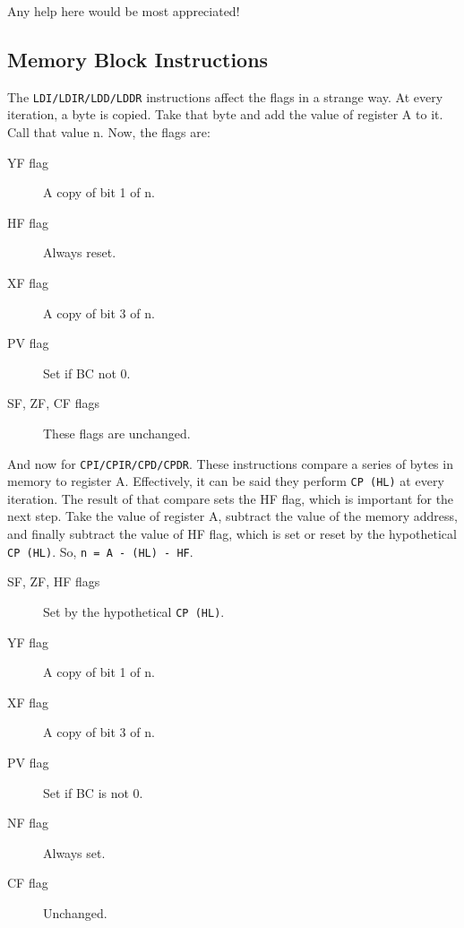 \documentclass[12pt,twoside,openright,a4paper]{book}
\begin{document}
Any help here would be most appreciated!


\subsection{Memory Block Instructions \cite{mrison}}
\label{block_mem}

The {\tt LDI/LDIR/LDD/LDDR} instructions affect the flags in a strange way. At every iteration, a byte is copied. Take that byte and add the value of register A to it. Call that value n. Now, the flags are:

\begin{description}
 
	\item[YF flag]
	A copy of bit 1 of n.

	\item[HF flag]
	Always reset.

	\item[XF flag]
	A copy of bit 3 of n.

	\item[PV flag]
	Set if BC not 0.

	\item[SF, ZF, CF flags]
	These flags are unchanged.

\end{description}

And now for {\tt CPI/CPIR/CPD/CPDR}. These instructions compare a series of bytes in memory to register A. Effectively, it can be said they perform {\tt CP (HL)} at every iteration. The result of that compare sets the HF flag, which is important for the next step. Take the value of register A, subtract the value of the memory address, and finally subtract the value of HF flag, which is set or reset by the hypothetical {\tt CP (HL)}. So, {\tt n = A - (HL) - HF}.

\begin{description}

	\item[SF, ZF, HF flags]
	Set by the hypothetical {\tt CP (HL)}.

	\item[YF flag]
	A copy of bit 1 of n.

	\item[XF flag]
	A copy of bit 3 of n.

	\item[PV flag]
	Set if BC is not 0.

	\item[NF flag]
	Always set.

	\item[CF flag]
	Unchanged.

\end{description}
\end{document}
